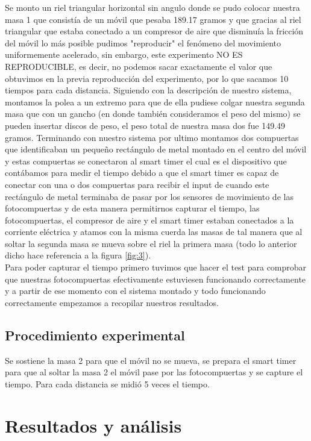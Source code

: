 \documentclass{article}
\begin{document}
\begin{multicols}{2}
Se monto un riel triangular horizontal sin angulo donde se pudo colocar nuestra masa 1 que consistía de un móvil que pesaba 189.17 gramos y que gracias 
al riel triangular que estaba conectado a un compresor de aire que disminuía la fricción del móvil lo más posible pudimos "reproducir" el fenómeno 
del movimiento uniformemente acelerado, sin embargo, este experimento NO ES REPRODUCIBLE, es decir, no podemos sacar exactamente el valor que obtuvimos en la previa reproducción del experimento,
por lo que sacamos 10 tiempos para cada distancia. Siguiendo con la descripción de nuestro sistema, montamos la polea a un extremo para que de ella pudiese colgar nuestra segunda masa que con un gancho (en donde también consideramos el peso del mismo) se pueden insertar discos de peso,
el peso total de nuestra masa dos fue 149.49 gramos. Terminando con nuestro sistema por ultimo montamos dos compuertas que identificaban un pequeño rectángulo de metal montado en el centro del móvil y estas compuertas se conectaron al smart timer
el cual es el dispositivo que contábamos para medir el tiempo debido a que el smart timer es capaz de conectar con una o dos compuertas para recibir el input de cuando este rectángulo de metal terminaba de pasar por los sensores de movimiento de las fotocompuertas y de esta manera permitirnos 
capturar el tiempo, las fotocompuertas, el compresor de aire y el smart timer estaban conectados a la corriente eléctrica y atamos con la misma cuerda las masas de tal manera que al soltar la segunda masa se mueva sobre el riel la primera masa (todo lo anterior dicho hace referencia a la figura \ref*{fig:3}).
\\
Para poder capturar el tiempo primero tuvimos que hacer el test para comprobar que nuestras fotocompuertas efectivamente estuviesen funcionando correctamente y a partir de ese momento con el sistema montado y todo funcionando correctamente empezamos a recopilar nuestros resultados.     

\subsection*{Procedimiento experimental}\label{Procedimiento experimental}
Se sostiene la masa 2 para que el móvil no se mueva, se prepara el smart timer para que al soltar la masa 2 el móvil pase por las fotocompuertas y se capture el tiempo.
Para cada distancia se midió 5 veces el tiempo.
\section*{Resultados y análisis}\label{Resultados}			%



\end{multicols}
\end{document}
